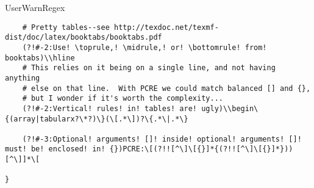 \begin{chktexrclistvar}{UserWarnRegex}
\begin{verbatim}
    # Pretty tables--see http://texdoc.net/texmf-dist/doc/latex/booktabs/booktabs.pdf
    (?!#-2:Use! \toprule,! \midrule,! or! \bottomrule! from! booktabs)\\hline
    # This relies on it being on a single line, and not having anything
    # else on that line.  With PCRE we could match balanced [] and {},
    # but I wonder if it's worth the complexity...
    (?!#-2:Vertical! rules! in! tables! are! ugly)\\begin\{(array|tabularx?\*?)\}(\[.*\])?\{.*\|.*\}

    (?!#-3:Optional! arguments! []! inside! optional! arguments! []! must! be! enclosed! in! {})PCRE:\[(?!![^\]\[{}]*{(?!![^\]\[{}]*}))[^\]]*\[

}
\end{verbatim}
\end{chktexrclistvar}




